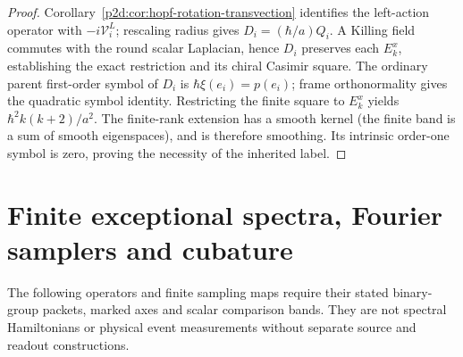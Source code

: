 \documentclass[12pt,a4paper]{article}
\begin{document}
\begin{proof}
Corollary~\ref{p2d:cor:hopf-rotation-transvection} identifies the
left-action operator with $-i\mathcal V_i^L$; rescaling radius gives
$D_i=(\hbar/a)Q_i$. A Killing field commutes with the round scalar
Laplacian, hence $D_i$ preserves each $E_k^x$, establishing the exact
restriction and its chiral Casimir square. The ordinary parent
first-order symbol of $D_i$ is $\hbar\xi(e_i)=p(e_i)$; frame
orthonormality gives the quadratic symbol identity. Restricting the
finite square to $E_k^x$ yields
$\hbar^2k(k+2)/a^2$.
The finite-rank extension has a smooth kernel (the finite band is a sum
of smooth eigenspaces), and is therefore smoothing. Its intrinsic
order-one symbol is zero, proving the necessity of the inherited label.
\end{proof}


\section{Finite exceptional spectra, Fourier samplers and cubature}
\label{p2d:sec:finite-exceptional-comparisons}
The following operators and finite sampling maps require their stated
binary-group packets, marked axes and scalar comparison bands.  They
are not spectral Hamiltonians or physical event measurements without
separate source and readout constructions.
\end{document}
